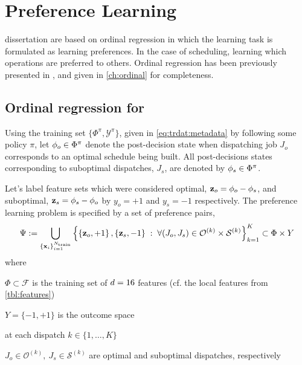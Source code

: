 
\chapter{Preference Learning}\label{ch:prefmodels} 
 dissertation are based on ordinal regression in which the learning task is formulated as learning preferences. In the case of scheduling, learning which operations are preferred to others. Ordinal regression has been previously presented in \cite{Ru06:PPSN}, and given in \cref{ch:ordinal} for completeness. 

\section{Ordinal regression for \jsp}
Using the training set $\{\Phi^\pi,\mathcal{Y}^\pi\}$, given in 
\cref{eq:trdat:metadata} by following some policy $\pi$, 
let ${\mathbf{\phi}}_{o}\in\Phi^\pi$ denote the post-decision state when dispatching 
job $J_o$ corresponds to an optimal schedule being built. All post-decisions 
states corresponding to suboptimal dispatches, $J_s$, are denoted by 
${\mathbf{\phi}}_{s}\in\Phi^\pi$. 

Let's label feature sets which were considered optimal, 
$\mathbf{z}_{o}={\mathbf{\phi}}_{o}-{\mathbf{\phi}}_{s}$, and suboptimal, 
$\mathbf{z}_{s}={\mathbf{\phi}}_{s}-{\mathbf{\phi}}_{o}$ by $y_o=+1$ and $y_s=-1$ respectively. 
The preference learning problem is specified by a set of preference pairs,
\begin{equation}\label{eq:Psi:jsp}
	\Psi := \bigcup_{\{\vec{x}_i\}_{i=1}^{N_{\train}}}
    \condset{
        \left\{\vec{z}_o,+1\right\},\left\{\vec{z}_s,-1\right\}}{\forall 
        (J_o,J_s) 
        \in \mathcal{O}^{(k)} \times \mathcal{S}^{(k)}}_{k=1}^K 
    \subset \Phi\times Y 
\end{equation}
where 
\begin{enumerate*}
  \item $\Phi\subset\mathcal{F}$ is the training set of $d=16$ 
  features (cf. the local features from \cref{tbl:features}) 
  \item $Y=\{-1,+1\}$ is the outcome space
  \item at each dispatch $k\in\{1,\ldots,K\}$
  \item $J_o\in\mathcal{O}^{(k)},~J_s\in \mathcal{S}^{(k)}$
  are optimal and suboptimal dispatches, respectively
\end{enumerate*}


